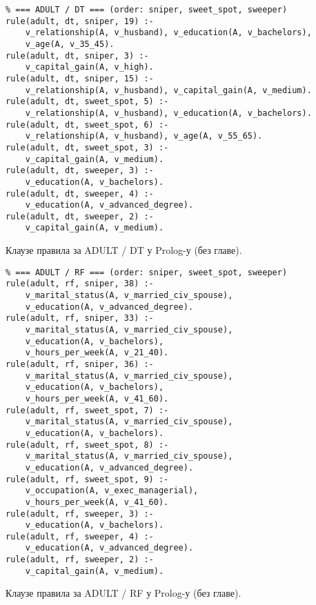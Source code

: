 \begin{appendices}
\begin{listing}[H]
\begin{verbatim}
% === ADULT / DT === (order: sniper, sweet_spot, sweeper)
rule(adult, dt, sniper, 19) :-
    v_relationship(A, v_husband), v_education(A, v_bachelors),
    v_age(A, v_35_45).
rule(adult, dt, sniper, 3) :-
    v_capital_gain(A, v_high).
rule(adult, dt, sniper, 15) :-
    v_relationship(A, v_husband), v_capital_gain(A, v_medium).
rule(adult, dt, sweet_spot, 5) :-
    v_relationship(A, v_husband), v_education(A, v_bachelors).
rule(adult, dt, sweet_spot, 6) :-
    v_relationship(A, v_husband), v_age(A, v_55_65).
rule(adult, dt, sweet_spot, 3) :-
    v_capital_gain(A, v_medium).
rule(adult, dt, sweeper, 3) :-
    v_education(A, v_bachelors).
rule(adult, dt, sweeper, 4) :-
    v_education(A, v_advanced_degree).
rule(adult, dt, sweeper, 2) :-
    v_capital_gain(A, v_medium).
\end{verbatim}
\caption{Клаузе правила за ADULT / DT у Prolog-у (без главе).}
\label{code:prologbk-adult-dt}
\end{listing}

\begin{listing}[H]
\begin{verbatim}
% === ADULT / RF === (order: sniper, sweet_spot, sweeper)
rule(adult, rf, sniper, 38) :-
    v_marital_status(A, v_married_civ_spouse),
    v_education(A, v_advanced_degree).
rule(adult, rf, sniper, 33) :-
    v_marital_status(A, v_married_civ_spouse),
    v_education(A, v_bachelors),
    v_hours_per_week(A, v_21_40).
rule(adult, rf, sniper, 36) :-
    v_marital_status(A, v_married_civ_spouse),
    v_education(A, v_bachelors),
    v_hours_per_week(A, v_41_60).
rule(adult, rf, sweet_spot, 7) :-
    v_marital_status(A, v_married_civ_spouse),
    v_education(A, v_bachelors).
rule(adult, rf, sweet_spot, 8) :-
    v_marital_status(A, v_married_civ_spouse),
    v_education(A, v_advanced_degree).
rule(adult, rf, sweet_spot, 9) :-
    v_occupation(A, v_exec_managerial),
    v_hours_per_week(A, v_41_60).
rule(adult, rf, sweeper, 3) :-
    v_education(A, v_bachelors).
rule(adult, rf, sweeper, 4) :-
    v_education(A, v_advanced_degree).
rule(adult, rf, sweeper, 2) :-
    v_capital_gain(A, v_medium).
\end{verbatim}
\caption{Клаузе правила за ADULT / RF у Prolog-у (без главе).}
\label{code:prologbk-adult-rf}
\end{listing}


\end{appendices}

